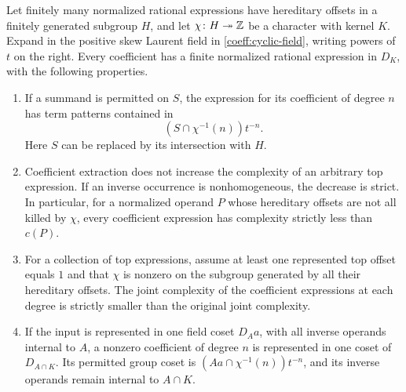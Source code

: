\begin{lemma}\label{coeff:extraction}
Let finitely many normalized rational expressions have hereditary
offsets in a finitely generated subgroup \(H\), and let
\(\chi\colon H\twoheadrightarrow\mathbb Z\) be a character with kernel
\(K\). Expand in the positive skew Laurent field in
\eqref{coeff:cyclic-field}, writing powers of \(t\) on the right.
Every coefficient has a finite normalized rational expression in
\(D_K\), with the following properties.
\begin{enumerate}[label=\textup{(\alph*)}]
\item If a summand is permitted on \(S\), the expression for its
coefficient of degree \(n\) has term patterns contained in
\[
 (S\cap\chi^{-1}(n))t^{-n}.
\]
Here \(S\) can be replaced by its intersection with \(H\).
\item Coefficient extraction does not increase the complexity of an
arbitrary top expression. If an inverse occurrence is nonhomogeneous,
the decrease is strict. In particular, for a normalized operand \(P\)
whose hereditary offsets are not all killed by \(\chi\), every
coefficient expression has complexity strictly less than \(c(P)\).
\item For a collection of top expressions, assume at least one
represented top offset equals \(1\) and that \(\chi\) is nonzero on
the subgroup generated by all their hereditary offsets. The joint
complexity of the coefficient expressions at each degree is strictly
smaller than the original joint complexity.
\item If the input is represented in one field coset \(D_Aa\), with
all inverse operands internal to \(A\), a nonzero coefficient of
degree \(n\) is represented in one coset of \(D_{A\cap K}\). Its
permitted group coset is
\((Aa\cap\chi^{-1}(n))t^{-n}\), and its inverse operands remain
internal to \(A\cap K\).
\end{enumerate}
\end{lemma}

